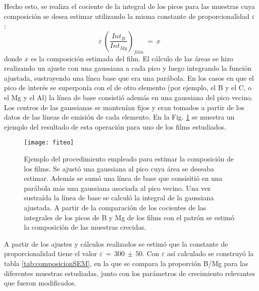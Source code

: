 Hecho esto, se realiza el cociente de la integral de los picos para las muestras cuya composición se desea estimar utilizando la misma constante de proporcionalidad $\varepsilon$:
\begin{equation}
  \varepsilon \ \left( \frac{Int_{B}}{Int_{Mg}} \right)_{film} \ = \ x
  \label{eq:film}
\end{equation}
\noindent
donde $x$ es la composición estimada del film. El cálculo de las áreas se hizo realizando un ajuste con una gaussiana a cada pico y luego integrando la función ajustada, sustrayendo una línea base que era una parábola. En los casos en que el pico de interés se superponía con el de otro elemento (por ejemplo, el B y el C, o el Mg y el Al) la línea de base consistió además en una gaussiana del pico vecino. Los centros de las gaussianas se mantenían fijos y eran tomados a partir de los datos de las líneas de emisión de cada elemento. En la Fig. \ref{fig:fiteos} se muestra un ejemplo del resultado de esta operación para uno de los films estudiados.
 \begin{figure}[tbh!]
   \begin{center}
	 \texttt{[image: fiteo]}
   \end{center}
   \caption[Ejemplo del procedimiento empleado para estimar la composición de los films.]{Ejemplo del procedimiento empleado para estimar la composición de los films. Se ajustó una gaussiana al pico cuya área se deseaba estimar. Además se sumó una línea de base que consisitió en una parábola más una gaussiana asociada al pico vecino. Una vez sustraída la línea de base se calculó la integral de la gaussiana ajustada. A partir de la comparación de los cocientes de las integrales de los picos de B y Mg de los films con el patrón se estimó la composición de las muestras crecidas.}
   \label{fig:fiteos}
 \end{figure}

 A partir de los ajustes y cálculos realizados se estimó que la constante de proporcionalidad tiene el valor $\varepsilon\,=\,300\,\pm\,50$. Con $\varepsilon$ así calculado se construyó la tabla \ref{tab:composicionSEM}, en la que se compara la proporción B/Mg para las diferentes muestras estudiadas, junto con los parámetros de crecimiento relevantes que fueron modificados.

